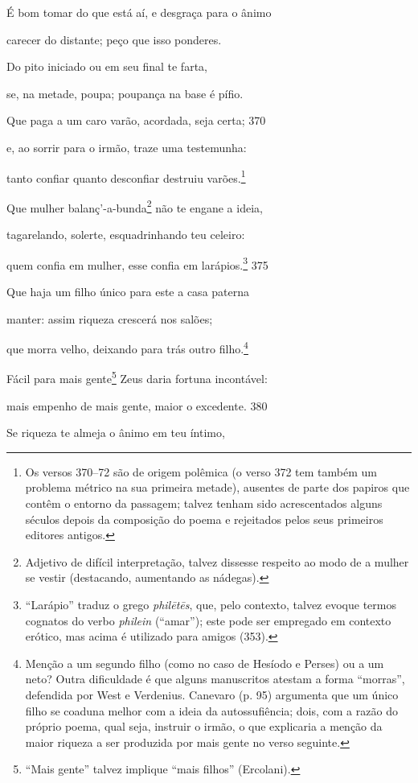 É bom tomar do que está aí, e desgraça para o ânimo

carecer do distante; peço que isso ponderes.

Do pito iniciado ou em seu final te farta,

se, na metade, poupa; poupança na base é pífio.

Que paga a um caro varão, acordada, seja certa; \num{370}

e, ao sorrir para o irmão, traze uma testemunha:

tanto confiar quanto desconfiar destruiu varões.\footnote{Os versos 370--72 são de origem polêmica (o verso 372 tem também um problema
métrico na sua primeira metade), ausentes de parte dos papiros que
contêm o entorno da passagem; talvez tenham sido acrescentados alguns
séculos depois da composição do poema e rejeitados pelos seus primeiros
editores antigos.}

Que mulher balanç'-a-bunda\footnote{Adjetivo de difícil interpretação, talvez dissesse respeito ao modo de a mulher se vestir (destacando, aumentando as nádegas).} não te engane a ideia,

tagarelando, solerte, esquadrinhando teu celeiro:

quem confia em mulher, esse confia em larápios.\footnote{``Larápio'' traduz o grego \emph{philētēs}, que, pelo contexto,
talvez evoque termos cognatos do verbo \emph{philein} (``amar''); este
pode ser empregado em contexto erótico, mas acima é utilizado para
amigos (353).} \num{375}

Que haja um filho único para este a casa paterna

manter: assim riqueza crescerá nos salões;

que morra velho, deixando para trás outro filho.\footnote{Menção a um segundo filho (como no caso de Hesíodo e Perses) ou a
um neto? Outra dificuldade é que alguns manuscritos atestam a forma
``morras'', defendida por West e Verdenius. Canevaro (p. 95) argumenta
que um único filho se coaduna melhor com a ideia da autossufiência;
dois, com a razão do próprio poema, qual seja, instruir o irmão, o que
explicaria a menção da maior riqueza a ser produzida por mais gente no
verso seguinte.}

Fácil para mais gente\footnote{``Mais gente'' talvez implique ``mais filhos'' (Ercolani).} Zeus daria fortuna incontável:

mais empenho de mais gente, maior o excedente. \num{380}

Se riqueza te almeja o ânimo em teu íntimo,

